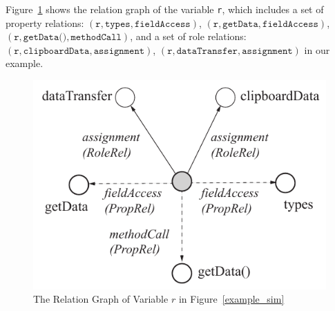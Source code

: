 Figure~\ref{SG_sample_ano} shows the relation graph of the variable
\texttt{r}, which includes a set of property relations:
$( \texttt{r}, \texttt{types}, \texttt{fieldAccess})$, $( \texttt{r},
\texttt{getData}, \texttt{fieldAccess})$, $( \texttt{r},
\texttt{getData()}, \texttt{methodCall})$,
%
and a set of role relations: $( \texttt{r}, \texttt{clipboardData},
\texttt{assignment})$, $( \texttt{r}, \texttt{dataTransfer},
\texttt{assignment})$ in our example.

\begin{figure}[t]
	\begin{center}
		\includegraphics[width=.7\columnwidth]{figures/stargraph.pdf}
		\caption{The Relation Graph of Variable $r$ in Figure~\ref{example_sim}}
		\label{SG_sample_ano}
	\end{center}
\end{figure}
